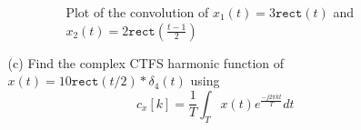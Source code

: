 \documentclass[a4paper, 12pt]{article}
\begin{document}
\begin{itemize}
\begin{itemize}
\begin{itemize}
\begin{figure}[h!]
\caption{\label{fig:2b_convolution}Plot of the convolution of $x_{1}(t) = 3\mathtt{rect}(t)$ and $x_{2}(t)= 2\mathtt{rect}(\frac{t-1}{2})$}
\end{figure}
\end{itemize}

\pagebreak
\item[(c)]{Find the complex CTFS harmonic function of $x(t) = 10\mathtt{rect}(t/2)*\delta_{4}(t)$ using}
\begin{equation}
c_{x}[k] = \frac{1}{T}\int_{T}{x(t)e^{\frac{-j2\pi kt}{T}}} dt
\end{equation}


\end{itemize}
\end{itemize}
\end{document}
